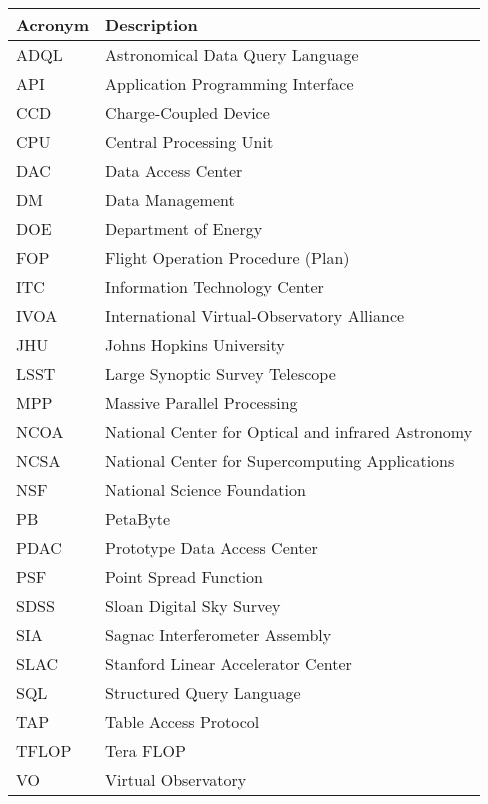 \addtocounter{table}{-1}
\begin{longtable}{|l|p{}|}\hline 
\textbf{Acronym} & \textbf{Description}  \\\hline
ADQL&Astronomical Data Query Language \\\hline
API&Application Programming Interface \\\hline
CCD&Charge-Coupled Device \\\hline
CPU&Central Processing Unit \\\hline
DAC&Data Access Center \\\hline
DM&Data Management \\\hline
DOE&Department of Energy \\\hline
FOP&Flight Operation Procedure (Plan) \\\hline
ITC&Information Technology Center \\\hline
IVOA&International Virtual-Observatory Alliance \\\hline
JHU&Johns Hopkins University \\\hline
LSST&Large Synoptic Survey Telescope \\\hline
MPP&Massive Parallel Processing \\\hline
NCOA&National Center for Optical and infrared  Astronomy \\\hline
NCSA&National Center for Supercomputing Applications \\\hline
NSF&National Science Foundation \\\hline
PB&PetaByte \\\hline
PDAC&Prototype Data Access Center \\\hline
PSF&Point Spread Function \\\hline
SDSS&Sloan Digital Sky Survey \\\hline
SIA&Sagnac Interferometer Assembly \\\hline
SLAC&Stanford Linear Accelerator Center \\\hline
SQL&Structured Query Language \\\hline
TAP&Table Access Protocol \\\hline
TFLOP&Tera FLOP \\\hline
VO&Virtual Observatory \\\hline
\end{longtable} 
